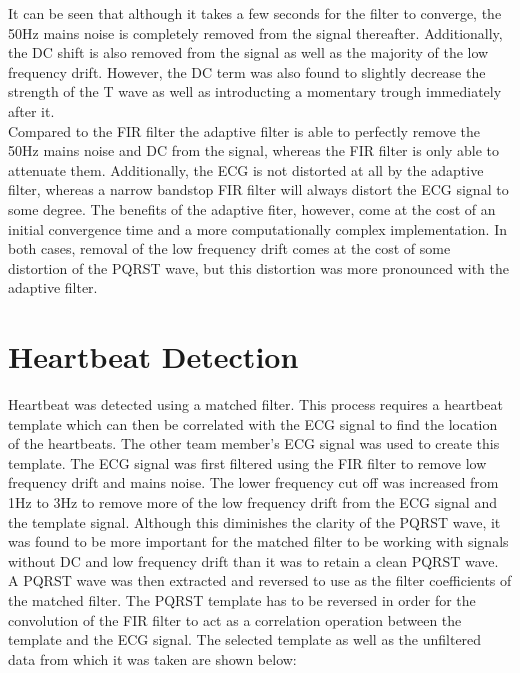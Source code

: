 \documentclass[8pt]{extarticle}
\begin{document}
It can be seen that although it takes a few seconds for the filter to converge, the 50Hz mains noise is completely removed from the
signal thereafter. Additionally, the DC shift is also removed from the signal as well as the majority of the low frequency drift.
However, the DC term was also found to slightly decrease the strength of the T wave as well as introducting a momentary trough immediately
after it.\\
Compared to the FIR filter the adaptive filter is able to perfectly remove the 50Hz mains noise and DC from the signal, whereas the FIR filter is
only able to attenuate them. Additionally, the ECG is not distorted at all by the adaptive filter, whereas a narrow bandstop FIR filter will always distort the ECG signal to some degree.
The benefits of the adaptive fiter, however, come at the cost of an initial convergence time and a more computationally complex implementation.
In both cases, removal of the low frequency drift comes at the cost of some distortion of the PQRST wave, but this distortion was more 
pronounced with the adaptive filter.

\section{Heartbeat Detection}

Heartbeat was detected using a matched filter. This process requires a heartbeat template which can then be correlated with the 
ECG signal to find the location of the heartbeats. The other team member's ECG signal was used to create this template. The ECG signal
was first filtered using the FIR filter to remove low frequency drift and mains noise. The lower frequency cut off was increased from
1Hz to 3Hz to remove more of the low frequency drift from the ECG signal and the template signal. Although this diminishes the clarity of the PQRST wave, it was found
to be more important for the matched filter to be working with signals without DC and low frequency drift than it was to retain a clean
PQRST wave.
A PQRST wave was then extracted and reversed
to use as the filter coefficients of the matched filter. The PQRST template has to be reversed in order for the convolution of the FIR
filter to act as a correlation operation between the template and the ECG signal. The selected template as well as the unfiltered data from which it
was taken are shown below:



\end{document}
